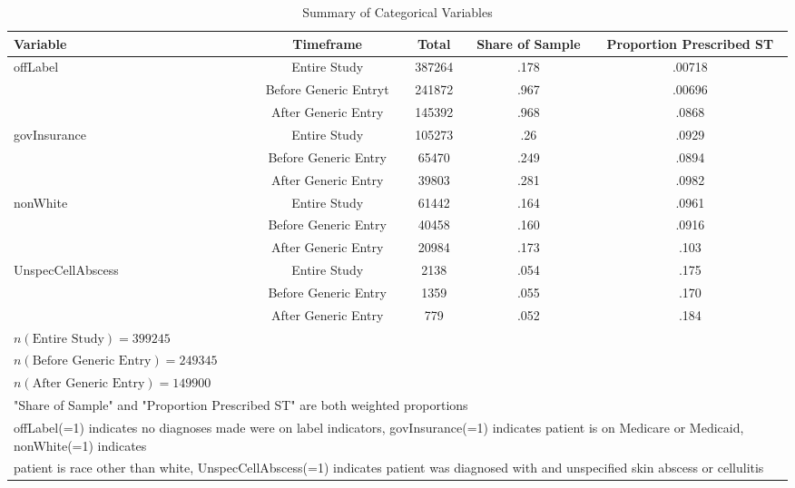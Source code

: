 \begin{table}[htbp]\centering
\def\sym#1{\ifmmode^{#1}\else\(^{#1}\)\fi}
\caption{Summary of Categorical Variables\label{tab1}}
\begin{tabular}{l*{4}{c}}
\hline\hline
            Variable&\multicolumn{1}{c}{Timeframe}&\multicolumn{1}{c}{Total}&\multicolumn{1}{c}{Share of Sample}&\multicolumn{1}{c}{Proportion Prescribed ST}\\
\hline
offLabel                  &     Entire Study&             387264&      .178&     .00718\\
                          &     Before Generic Entryt&    241872&      .967&     .00696\\
                          &     After Generic Entry&      145392&      .968&     .0868\\
[1em]
govInsurance              &     Entire Study&             105273&      .26 &     .0929\\
                          &     Before Generic Entry&     65470 &      .249&     .0894\\
                          &     After Generic Entry&      39803 &      .281&     .0982\\
[1em]
nonWhite                  &     Entire Study&             61442&      .164&     .0961\\
                          &     Before Generic Entry&     40458&      .160&     .0916\\
                          &     After Generic Entry&      20984&      .173&     .103\\
[1em]
UnspecCellAbscess         &     Entire Study&             2138 &      .054&     .175\\
                          &     Before Generic Entry&     1359 &      .055&     .170\\
                          &     After Generic Entry&      779  &      .052&     .184\\
\hline
$n(\text{Entire Study}) = 399245$\\
$n(\text{Before Generic Entry}) = 249345$\\
$n(\text{After Generic Entry}) = 149900$\\
\hline\hline
\multicolumn{5}{l}{"Share of Sample" and "Proportion Prescribed ST" are both weighted proportions}\\
\multicolumn{5}{l}{offLabel(=1) indicates no diagnoses made were on label indicators, govInsurance(=1) indicates patient is on Medicare or Medicaid, nonWhite(=1) indicates}\\
\multicolumn{5}{l}{patient is race other than white, UnspecCellAbscess(=1) indicates patient was diagnosed with and unspecified skin abscess or cellulitis}\\
\end{tabular}
\label{tab:Table4.3}
\end{table}

